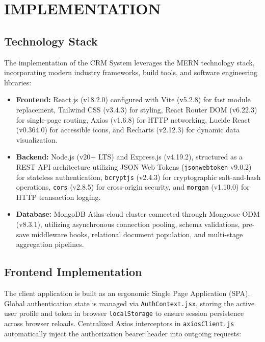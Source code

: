 \chapter{IMPLEMENTATION}

\section{Technology Stack}
The implementation of the CRM System leverages the MERN technology stack, incorporating modern industry frameworks, build tools, and software engineering libraries:
\begin{itemize}
    \item \textbf{Frontend:} React.js (v18.2.0) configured with Vite (v5.2.8) for fast module replacement, Tailwind CSS (v3.4.3) for styling, React Router DOM (v6.22.3) for single-page routing, Axios (v1.6.8) for HTTP networking, Lucide React (v0.364.0) for accessible icons, and Recharts (v2.12.3) for dynamic data visualization.
    \item \textbf{Backend:} Node.js (v20+ LTS) and Express.js (v4.19.2), structured as a REST API architecture utilizing JSON Web Tokens (\texttt{jsonwebtoken} v9.0.2) for stateless authentication, \texttt{bcryptjs} (v2.4.3) for cryptographic salt-and-hash operations, \texttt{cors} (v2.8.5) for cross-origin security, and \texttt{morgan} (v1.10.0) for HTTP transaction logging.
    \item \textbf{Database:} MongoDB Atlas cloud cluster connected through Mongoose ODM (v8.3.1), utilizing asynchronous connection pooling, schema validations, pre-save middleware hooks, relational document population, and multi-stage aggregation pipelines.
\end{itemize}

\section{Frontend Implementation}
The client application is built as an ergonomic Single Page Application (SPA). Global authentication state is managed via \texttt{AuthContext.jsx}, storing the active user profile and token in browser \texttt{localStorage} to ensure session persistence across browser reloads. Centralized Axios interceptors in \texttt{axiosClient.js} automatically inject the authorization bearer header into outgoing requests:

